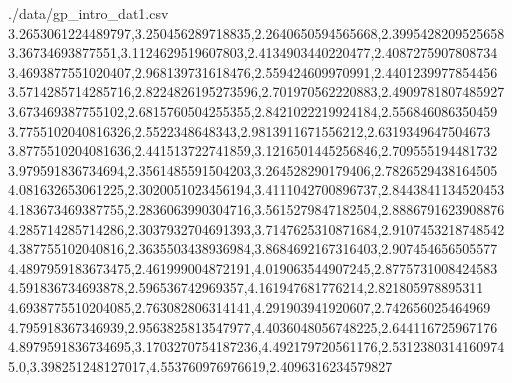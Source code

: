 \begin{filecontents*}{./data/gp_intro_dat1.csv}
    3.2653061224489797,3.250456289718835,2.2640650594565668,2.3995428209525658
    3.36734693877551,3.1124629519607803,2.4134903440220477,2.4087275907808734
    3.4693877551020407,2.968139731618476,2.559424609970991,2.4401239977854456
    3.5714285714285716,2.8224826195273596,2.701970562220883,2.4909781807485927
    3.673469387755102,2.6815760504255355,2.8421022219924184,2.556846086350459
    3.7755102040816326,2.5522348648343,2.9813911671556212,2.6319349647504673
    3.8775510204081636,2.441513722741859,3.1216501445256846,2.709555194481732
    3.979591836734694,2.3561485591504203,3.264528290179406,2.7826529438164505
    4.081632653061225,2.3020051023456194,3.4111042700896737,2.8443841134520453
    4.183673469387755,2.2836063990304716,3.5615279847182504,2.8886791623908876
    4.285714285714286,2.3037932704691393,3.7147625310871684,2.9107453218748542
    4.387755102040816,2.3635503438936984,3.8684692167316403,2.907454656505577
    4.4897959183673475,2.461999004872191,4.019063544907245,2.8775731008424583
    4.591836734693878,2.596536742969357,4.161947681776214,2.821805978895311
    4.6938775510204085,2.763082806314141,4.291903941920607,2.742656025464969
    4.795918367346939,2.9563825813547977,4.4036048056748225,2.644116725967176
    4.8979591836734695,3.1703270754187236,4.492179720561176,2.5312380314160974
    5.0,3.398251248127017,4.553760976976619,2.4096316234579827
\end{filecontents*}

